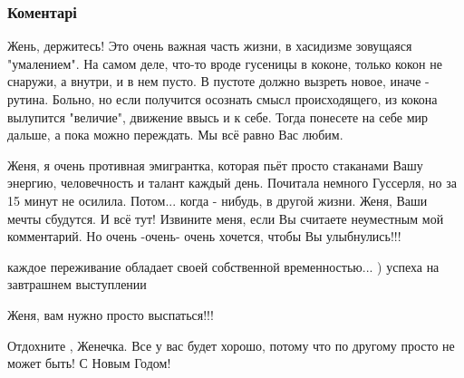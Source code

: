  
 
 
 
 
\subsubsection{Коментарі}
\label{sec:29_12_2014.fb.bilchenko_evgenia.1.bolnoj_monolog.cmt}

\begin{itemize}


Жень, держитесь! Это очень важная часть жизни, в хасидизме зовущаяся
"умалением". На самом деле, что-то вроде гусеницы в коконе, только кокон не
снаружи, а внутри, и в нем пусто. В пустоте должно вызреть новое, иначе -
рутина. Больно, но если получится осознать смысл происходящего, из кокона
вылупится "величие", движение ввысь и к себе. Тогда понесете на себе мир
дальше, а пока можно переждать. Мы всё равно Вас любим.



Женя, я очень противная эмигрантка, которая пьёт просто стаканами Вашу энергию,
человечность и талант каждый день. Почитала немного Гуссерля, но за 15 минут не
осилила. Потом... когда - нибудь, в другой жизни. Женя, Ваши мечты сбудутся. И
всё тут! Извините меня, если Вы считаете неуместным мой комментарий. Но очень
-очень- очень хочется, чтобы Вы улыбнулись!!!



каждое переживание обладает своей собственной временностью... ) успеха на завтрашнем выступлении



Женя, вам нужно просто выспаться!!!


Отдохните , Женечка. Все у вас будет хорошо, потому что по другому просто не может быть! С Новым Годом!


\end{itemize}

